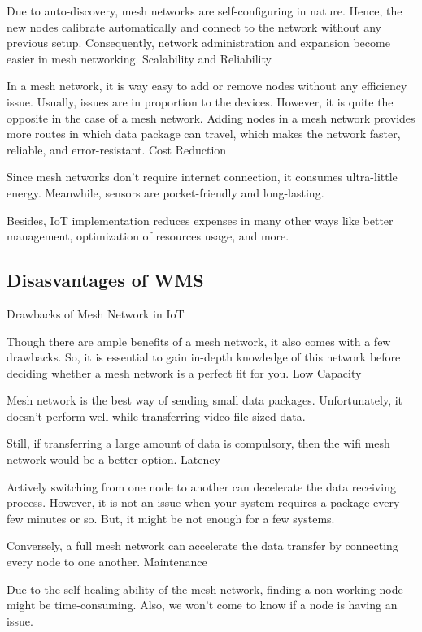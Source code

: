 			Due to auto-discovery, mesh networks are self-configuring in nature. Hence, the new nodes calibrate automatically and connect to the network without any previous setup. Consequently, network administration and expansion become easier in mesh networking.
			Scalability and Reliability
			
			In a mesh network, it is way easy to add or remove nodes without any efficiency issue. Usually, issues are in proportion to the devices. However, it is quite the opposite in the case of a mesh network. Adding nodes in a mesh network provides more routes in which data package can travel, which makes the network faster, reliable, and error-resistant.
			Cost Reduction
			
			Since mesh networks don’t require internet connection, it consumes ultra-little energy. Meanwhile, sensors are pocket-friendly and long-lasting.
			
			Besides, IoT implementation reduces expenses in many other ways like better management, optimization of resources usage, and more.
		
		\subsection{Disasvantages of WMS}
		
			Drawbacks of Mesh Network in IoT
			
			Though there are ample benefits of a mesh network, it also comes with a few drawbacks. So, it is essential to gain in-depth knowledge of this network before deciding whether a mesh network is a perfect fit for you.
			Low Capacity
			
			Mesh network is the best way of sending small data packages. Unfortunately, it doesn’t perform well while transferring video file sized data.
			
			Still, if transferring a large amount of data is compulsory, then the wifi mesh network would be a better option.
			Latency
			
			Actively switching from one node to another can decelerate the data receiving process. However, it is not an issue when your system requires a package every few minutes or so. But, it might be not enough for a few systems.
			
			Conversely, a full mesh network can accelerate the data transfer by connecting every node to one another.
			Maintenance
			
			Due to the self-healing ability of the mesh network, finding a non-working node might be time-consuming. Also, we won’t come to know if a node is having an issue.
			
